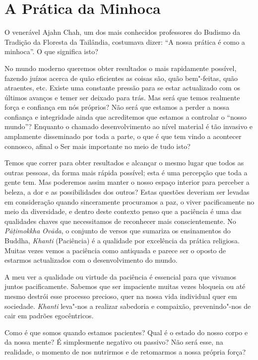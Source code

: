 \chapter{A Prática da Minhoca}

O venerável Ajahn Chah, um dos mais conhecidos professores do Budismo da
Tradição da Floresta da Tailândia, costumava dizer: ``A nossa prática é
como a minhoca''. O que significa isto?

No mundo moderno queremos obter resultados o mais rapidamente possível,
fazendo juízos acerca de quão eficientes as coisas são, quão bem"-feitas,
quão atraentes, etc. Existe uma constante pressão para se estar
actualizado com os últimos avanços e temer ser deixado para trás. Mas
será que temos realmente força e confiança em nós próprios? Não será que
estamos a perder a nossa confiança e integridade ainda que acreditemos
que estamos a controlar o ``nosso mundo''? Enquanto o chamado
desenvolvimento ao nível material é tão invasivo e amplamente
disseminado por toda a parte, o que é que tem vindo a acontecer
connosco, afinal o Ser mais importante no meio de tudo isto?

Temos que correr para obter resultados e alcançar o mesmo lugar que
todos as outras pessoas, da forma mais rápida possível; esta é uma
percepção que toda a gente tem. Mas poderemos assim manter o nosso
espaço interior para perceber a beleza, a dor e as possibilidades dos
outros? Estas questões deveriam ser levadas em consideração quando
sinceramente procuramos a paz, o viver pacificamente no meio da
diversidade, e dentro deste contexto penso que a paciência é uma das
qualidades chaves que necessitamos de reconhecer mais conscientemente.
No \emph{Pāṭimokkha} \emph{Ovāda}, o conjunto de versos que sumariza os
ensinamentos do Buddha, \emph{Khanti} (Paciência) é a qualidade por
excelência da prática religiosa. Muitas vezes vemos a paciência como
antiquada e parece ser o oposto de estarmos actualizados com o
desenvolvimento do mundo.

A meu ver a qualidade ou virtude da paciência é essencial para que
vivamos juntos pacificamente. Sabemos que ser impaciente muitas vezes
bloqueia ou até mesmo destrói esse processo precioso, quer na nossa vida
individual quer em sociedade. \emph{Khanti} leva"-nos a realizar
sabedoria e compaixão, prevenindo"-nos de cair em padrões egocêntricos.

Como é que somos quando estamos pacientes? Qual é o estado do nosso
corpo e da nossa mente? É simplesmente negativo ou passivo? Não será
esse, na realidade, o momento de nos nutrirmos e de retomarmos a nossa
própria força?

